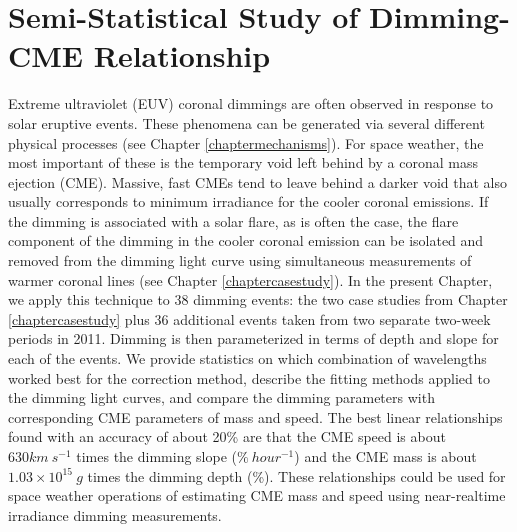 \chapter{Semi-Statistical Study of Dimming-CME Relationship}
\label{chapterstatistical}

Extreme ultraviolet (EUV) coronal dimmings are often observed in response to solar eruptive events. These phenomena can be generated via several different physical processes (see Chapter \ref{chaptermechanisms}). For space weather, the most important of these is the temporary void left behind by a coronal mass ejection (CME). Massive, fast CMEs tend to leave behind a darker void that also usually corresponds to minimum irradiance for the cooler coronal emissions. If the dimming is associated with a solar flare, as is often the case, the flare component of the dimming in the cooler coronal emission can be isolated and removed from the dimming light curve using simultaneous measurements of warmer coronal lines (see Chapter \ref{chaptercasestudy}). In the present Chapter, we apply this technique to 38 dimming events: the two case studies from Chapter \ref{chaptercasestudy} plus 36 additional events taken from two separate two-week periods in 2011. Dimming is then parameterized in terms of depth and slope for each of the events. We provide statistics on which combination of wavelengths worked best for the correction method, describe the fitting methods applied to the dimming light curves, and compare the dimming parameters with corresponding CME parameters of mass and speed. The best linear relationships found with an accuracy of about 20\% are that the CME speed is about $630 km\ s^{-1}$ times the dimming slope ($\%\ hour^{-1}$) and the CME mass is about $1.03 \times 10^{15}\ g$ times the dimming depth (\%). These relationships could be used for space weather operations of estimating CME mass and speed using near-realtime irradiance dimming measurements.


